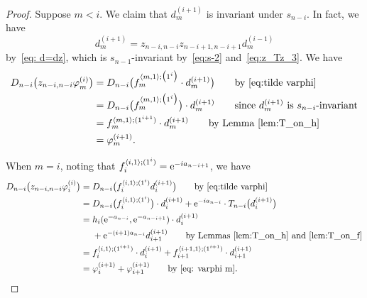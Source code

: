 \documentclass[10pt,a4paper]{amsart}
\numberwithin{equation}{section}
\newcommand{\ha}{f}
\theoremstyle{definition}
\begin{document}
\begin{proof}

Suppose $m<i$. We claim that $d^{(i+1)}_m$ is invariant under $s_{n-i}$.
In fact, we have
\begin{equation*}
 d^{(i+1)}_m=z_{n-i,n-i}z_{n-i+1,n-i+1}d^{(i-1)}_m
\end{equation*} by~\eqref{eq: d=dz},
which is $s_{n-1}$-invariant
by~\eqref{eq:s-2} and~\eqref{eq:z_Tz_3}.
We have
\begin{align*}
D_{n-i}\bigl({z_{n-i,n-i}{\varphi}}^{(i)}_m\bigr)&=
D_{n-i}\bigl(\ha_{m}^{\langle m,1\rangle; \bigl(1^i\bigr)}\cdot d^{(i+1)}_m\bigr)\qquad\text{by $\eqref{eq:tilde varphi}$}\\
&=D_{n-i}\bigl(\ha_{m}^{\langle m,1\rangle; \bigl(1^i\bigr)}\bigr)\cdot d^{(i+1)}_m\qquad\text{since $d^{(i+1)}_m$ is $s_{n-i}$-invariant}
\\&=
\ha_{m}^{\langle m,1\rangle; (1^{i+1})}\cdot d^{(i+1)}_m
\qquad\text{by Lemma~\ref{lem:T_on_h} }
\\&=\varphi^{(i+1)}_m.
\end{align*}

When $m=i$, noting that
$\ha_i^{\langle i,1\rangle; (1^{i})}
={\rm e}^{-ia_{n-i+1}}$,
we have
\begin{align*}
D_{n-i}\bigl({z_{n-i,n-i}{\varphi}}^{(i)}_i\bigr)
={}&
D_{n-i}\bigl(
\ha_i^{\langle i,1\rangle; (1^{i})}
d^{(i+1)}_i\bigr)\qquad\text{by~\eqref{eq:tilde varphi}}\\
={}&
D_{n-i}\bigl(\ha_i^{\langle i,1\rangle; (1^{i})}\bigr)\cdot d^{(i+1)}_i
+{\rm e}^{-ia_{n-i}}\cdot T_{n-i}\bigl(d^{(i+1)}_i\bigr)\\
={}&
h_i({\rm e}^{-a_{n-i}},{\rm e}^{-a_{n-i+1}})\cdot d_{i}^{(i+1)}\\
&+{\rm e}^{-(i+1)a_{n-i}}d^{(i+1)}_{i+1}
\qquad\text{by Lemmas~\ref{lem:T_on_h} and~\ref{lem:T_on_f}}\\
={}&\ha_i^{\langle i,1\rangle; (1^{i+1})}\cdot d_{i}^{(i+1)}+
\ha_{i+1}^{\langle i+1,1\rangle;(1^{i+1})}\cdot d^{(i+1)}_{i+1}
\\
={}&\varphi^{(i+1)}_i+\varphi^{(i+1)}_{i+1} \qquad\text{by~\eqref{eq: varphi m}}.\tag*{\qed}
\end{align*} \renewcommand{\qed}{}
\end{proof}
\end{document}
